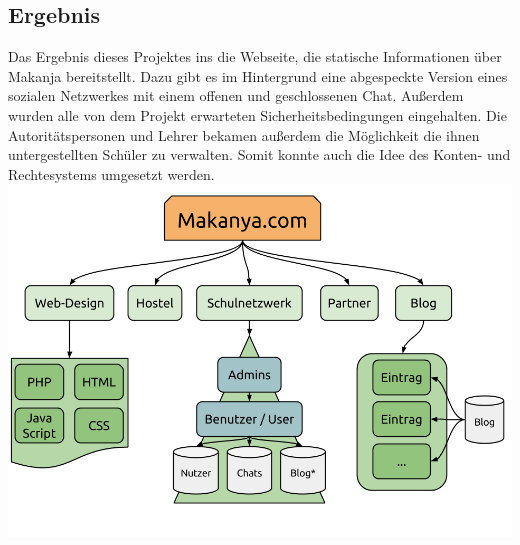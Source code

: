 


\subsection{Ergebnis} %
Das Ergebnis dieses Projektes ins die Webseite, die statische Informationen über Makanja bereitstellt.
Dazu gibt es im Hintergrund eine abgespeckte Version eines sozialen Netzwerkes mit einem offenen und geschlossenen Chat.
Außerdem wurden alle von dem Projekt erwarteten Sicherheitsbedingungen eingehalten.
Die Autoritätspersonen und Lehrer bekamen außerdem die Möglichkeit die ihnen untergestellten Schüler zu verwalten.
Somit konnte auch die Idee des Konten- und Rechtesystems umgesetzt werden.
\includegraphics[width=\linewidth]{imgs/makanyaOverview.png}\\
